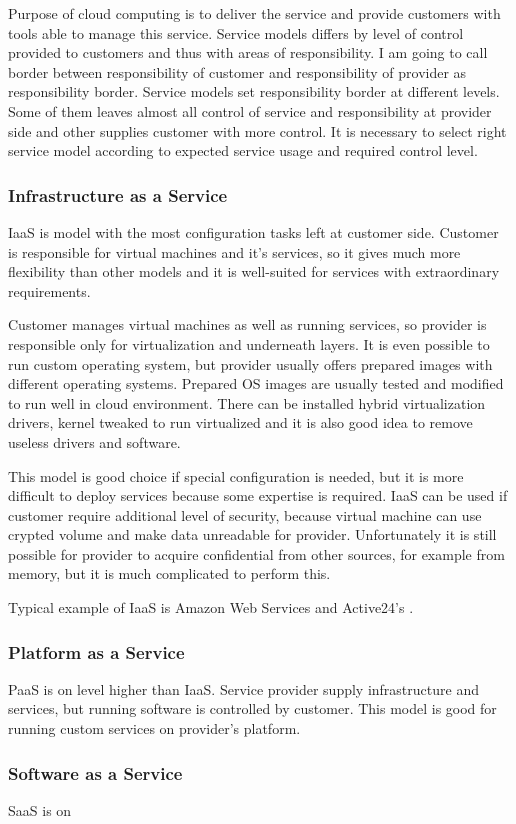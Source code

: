 
Purpose of cloud computing is to deliver the service and provide customers with tools able to manage this service. Service models differs by level of control provided to customers and thus with areas of responsibility. I am going to call border between responsibility of customer and responsibility of provider as responsibility border. 
Service models set responsibility border at different levels. Some of them leaves almost all control of service and responsibility at provider side and other supplies customer with more control. It is necessary to select right service model according to expected service usage and required control level.

\subsubsection{Infrastructure as a Service}
\Ac{IaaS} is model with the most configuration tasks left at customer side. Customer is responsible for virtual machines and it's services, so it gives much more flexibility than other models and it is well-suited for services with extraordinary requirements. 

Customer manages virtual machines as well as running services, so provider is responsible only for virtualization and underneath layers. It is even possible to run custom operating system, but provider usually offers prepared images with different operating systems. Prepared \Ac{OS} images are usually tested and modified to run well in cloud environment. There can be installed hybrid virtualization drivers, kernel tweaked to run virtualized and it is also good idea to remove useless drivers and software. 

This model is good choice if special configuration is needed, but it is more difficult to deploy services because some expertise is required. \Ac{IaaS} can be used if customer require additional level of security, because virtual machine can use crypted volume and make data unreadable for provider. Unfortunately it is still possible for provider to acquire confidential from other sources, for example from memory, but it is much complicated to perform this.

Typical example of \Ac{IaaS} is Amazon Web Services and Active24's .

\subsubsection{Platform as a Service}
\Ac{PaaS} is on level higher than \Ac{IaaS}. Service provider supply infrastructure and services, but running software is controlled by customer. This model is good for running custom services on provider's platform.

\subsubsection{Software as a Service}
\Ac{SaaS} is on 

